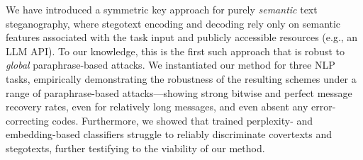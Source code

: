 We have introduced a symmetric key approach for purely \emph{semantic} text steganography, where stegotext encoding and decoding rely only on semantic features associated with the task input and publicly accessible resources (e.g., an LLM API). To our knowledge, this is the first such approach that is robust to \emph{global} paraphrase-based attacks. We instantiated our method for three NLP tasks, empirically demonstrating the robustness of the resulting schemes under a range of paraphrase-based attacks---showing strong bitwise and perfect message recovery rates, even for relatively long messages, and even absent any error-correcting codes. Furthermore, we showed that trained perplexity- and embedding-based classifiers struggle to reliably discriminate covertexts and stegotexts, further testifying to the viability of our method.